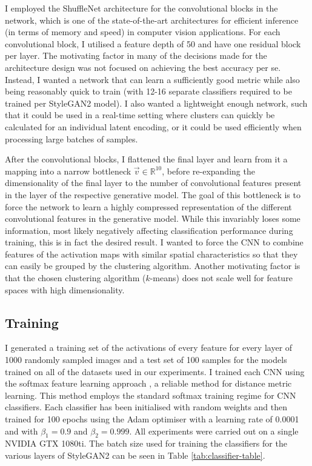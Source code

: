I employed the ShuffleNet architecture \citep{zhang2018shufflenet} for the convolutional blocks in the network, which is one of the state-of-the-art architectures for efficient inference (in terms of memory and speed) in computer vision applications. 
For each convolutional block, I utilised a feature depth of 50 and have one residual block per layer. 
The motivating factor in many of the decisions made for the architecture design was not focused on achieving the best accuracy per se. 
Instead, I wanted a network that can learn a sufficiently good metric while also being reasonably quick to train (with 12-16 separate classifiers required to be trained per StyleGAN2 model). 
I also wanted a lightweight enough network, such that it could be used in a real-time setting where clusters can quickly be calculated for an individual latent encoding, or it could be used efficiently when processing large batches of samples.

After the convolutional blocks, I flattened the final layer and learn from it a mapping into a narrow bottleneck $\vec{v} \in \mathbb{R}^{10}$, before re-expanding the dimensionality of the final layer to the number of convolutional features present in the layer of the respective generative model. 
The goal of this bottleneck is to force the network to learn a highly compressed representation of the different convolutional features in the generative model. 
While this invariably loses some information, most likely negatively affecting classification performance during training, this is in fact the desired result. 
I wanted to force the CNN to combine features of the activation maps with similar spatial characteristics so that they can easily be grouped by the clustering algorithm. 
Another motivating factor is that the chosen clustering algorithm ($k$-means) does not scale well for feature spaces with high dimensionality.

\subsection{Training}

I generated a training set of the activations of every feature for every layer of 1000 randomly sampled images and a test set of 100 samples for the models trained on all of the datasets used in our experiments. 
I trained each CNN using the softmax feature learning approach \citep{dosovitskiy2014discriminative}, a reliable method for distance metric learning. This method employs the standard softmax training regime \citep{bridle1990probabilistic} for CNN classifiers. 
Each classifier has been initialised with random weights and then trained for 100 epochs using the Adam optimiser \citep{kingma2015adam} with a learning rate of 0.0001 and with $\beta_1 = 0.9$ and $\beta_2 = 0.999$. 
All experiments were carried out on a single NVIDIA GTX 1080ti. The batch size used for training the classifiers for the various layers of StyleGAN2 can be seen in Table \ref{tab:classifier-table}. 

